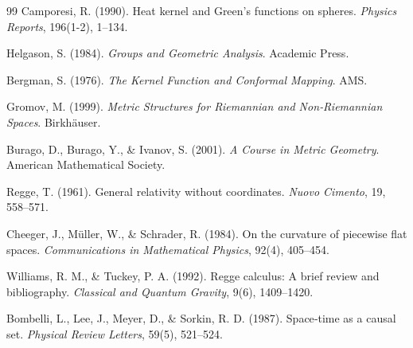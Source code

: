\documentclass[12pt]{article}
\numberwithin{equation}{section}
\begin{document}
\begin{thebibliography}{99}
Camporesi, R. (1990). Heat kernel and Green's functions on spheres. \textit{Physics Reports}, 196(1-2), 1–134.

Helgason, S. (1984). \textit{Groups and Geometric Analysis}. Academic Press.

Bergman, S. (1976). \textit{The Kernel Function and Conformal Mapping}. AMS.

Gromov, M. (1999). \textit{Metric Structures for Riemannian and Non‑Riemannian Spaces}. Birkh{\"a}user.

Burago, D., Burago, Y., \& Ivanov, S. (2001). \textit{A Course in Metric Geometry}. American Mathematical Society.

Regge, T. (1961). General relativity without coordinates. \textit{Nuovo Cimento}, 19, 558–571.

Cheeger, J., M{\"u}ller, W., \& Schrader, R. (1984). On the curvature of piecewise flat spaces. \textit{Communications in Mathematical Physics}, 92(4), 405–454.

Williams, R. M., \& Tuckey, P. A. (1992). Regge calculus: A brief review and bibliography. \textit{Classical and Quantum Gravity}, 9(6), 1409–1420.

Bombelli, L., Lee, J., Meyer, D., \& Sorkin, R. D. (1987). Space‑time as a causal set. \textit{Physical Review Letters}, 59(5), 521–524.
\end{thebibliography}
\end{document}
